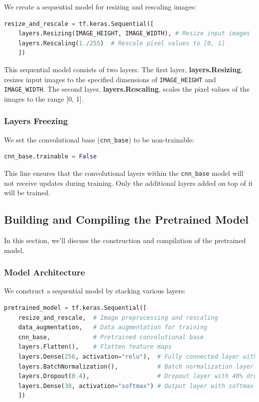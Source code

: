 We create a sequential model for resizing and rescaling images:

\begin{lstlisting}[language=Python]
	resize_and_rescale = tf.keras.Sequential([
	layers.Resizing(IMAGE_HEIGHT, IMAGE_WIDTH), # Resize input images
	layers.Rescaling(1./255)  # Rescale pixel values to [0, 1]
	])
\end{lstlisting}

This sequential model consists of two layers. The first layer, \textbf{layers.Resizing}, resizes input images to the 
specified dimensions of \texttt{IMAGE\_HEIGHT} and \texttt{IMAGE\_WIDTH}. The second layer, \textbf{layers.Rescaling}, 
scales the pixel values of the images to the range [0, 1].

\subsubsection{Layers Freezing}

We set the convolutional base (\texttt{cnn\_base}) to be non-trainable:

	\begin{lstlisting}[language=Python]
		cnn_base.trainable = False
	\end{lstlisting}

This line ensures that the convolutional layers within the \texttt{cnn\_base} model will not receive updates 
during training. Only the additional layers added on top of it will be trained.

\subsection{Building and Compiling the Pretrained Model}

In this section, we'll discuss the construction and compilation of the pretrained model.

\subsubsection{Model Architecture}

We construct a sequential model by stacking various layers:

\begin{lstlisting}[language=Python]
	pretrained_model = tf.keras.Sequential([
	resize_and_rescale,  # Image preprocessing and rescaling
	data_augmentation,   # Data augmentation for training
	cnn_base,            # Pretrained convolutional base
	layers.Flatten(),    # Flatten feature maps
	layers.Dense(256, activation="relu"),  # Fully connected layer with ReLU activation
	layers.BatchNormalization(),           # Batch normalization layer
	layers.Dropout(0.4),                   # Dropout layer with 40% dropout rate
	layers.Dense(38, activation="softmax") # Output layer with softmax activation
	])
\end{lstlisting}

